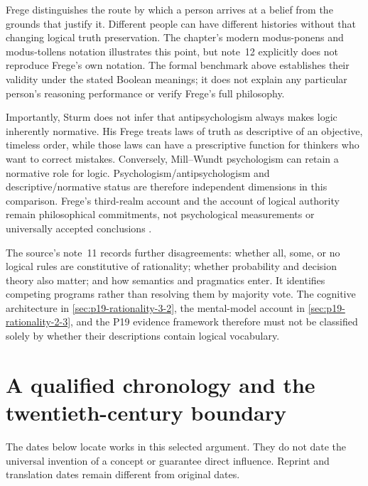Frege distinguishes the route by which a person arrives at a belief
from the grounds that justify it. Different people can have different
histories without that changing logical truth preservation. The
chapter's modern modus-ponens and modus-tollens notation illustrates
this point, but note~12 explicitly does not reproduce Frege's own
notation. The formal benchmark above establishes their validity under
the stated Boolean meanings; it does not explain any particular person's
reasoning performance or verify Frege's full philosophy.

Importantly, Sturm does not infer that antipsychologism always makes
logic inherently normative. His Frege treats laws of truth as descriptive
of an objective, timeless order, while those laws can have a prescriptive
function for thinkers who want to correct mistakes. Conversely,
Mill--Wundt psychologism can retain a normative role for logic.
Psychologism/antipsychologism and descriptive/normative status are
therefore independent dimensions in this comparison. Frege's third-realm
account and the account of logical authority remain philosophical
commitments, not psychological measurements or universally accepted
conclusions \parencite[p.~81]{Sturm2021DescriptiveNormativeHistory}.

The source's note~11 records further disagreements: whether all, some,
or no logical rules are constitutive of rationality; whether probability
and decision theory also matter; and how semantics and pragmatics enter.
It identifies competing programs rather than resolving them by majority
vote. The cognitive architecture in
\cref{sec:p19-rationality-3-2}, the mental-model account in
\cref{sec:p19-rationality-2-3}, and the P19 evidence framework therefore
must not be classified solely by whether their descriptions contain
logical vocabulary.

\section{A qualified chronology and the twentieth-century boundary}
\label{sec:p13-r11-chronology}

The dates below locate works in this selected argument. They do not
date the universal invention of a concept or guarantee direct influence.
Reprint and translation dates remain different from original dates.

